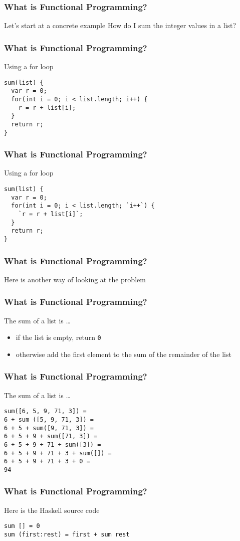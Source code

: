\begin{frame}
\frametitle{What is Functional Programming?}
\begin{block}{Let's start at a concrete example}
How do I sum the integer values in a list?
\end{block}
\end{frame}

\begin{frame}[fragile]
\frametitle{What is Functional Programming?}
\begin{block}{Using a for loop}
\begin{lstlisting}[style=java]
sum(list) {
  var r = 0;
  for(int i = 0; i < list.length; i++) {
    r = r + list[i];
  }
  return r;
}
\end{lstlisting}
\end{block}
\end{frame}

\begin{frame}[fragile]
\frametitle{What is Functional Programming?}
\begin{block}{Using a for loop}
\begin{lstlisting}[style=java]
sum(list) {
  var r = 0;
  for(int i = 0; i < list.length; `i++`) {
    `r = r + list[i]`;
  }
  return r;
}
\end{lstlisting}
\end{block}
\end{frame}

\begin{frame}
\frametitle{What is Functional Programming?}
\begin{center}
Here is another way of looking at the problem
\end{center}
\end{frame}

\begin{frame}
\frametitle{What is Functional Programming?}
\begin{block}{The sum of a list is \ldots}
\begin{itemize}
\item if the list is empty, return \lstinline{0}
\item otherwise add the first element to the sum of the remainder of the list
\end{itemize}
\end{block}
\end{frame}

\begin{frame}[fragile]
\frametitle{What is Functional Programming?}
\begin{block}{The sum of a list is \ldots}
\begin{lstlisting}
sum([6, 5, 9, 71, 3]) =
6 + sum ([5, 9, 71, 3]) =
6 + 5 + sum([9, 71, 3]) =
6 + 5 + 9 + sum([71, 3]) =
6 + 5 + 9 + 71 + sum([3]) =
6 + 5 + 9 + 71 + 3 + sum([]) =
6 + 5 + 9 + 71 + 3 + 0 =
94
\end{lstlisting}
\end{block}
\end{frame}

\begin{frame}[fragile]
\frametitle{What is Functional Programming?}
\begin{block}{Here is the Haskell source code}
\begin{lstlisting}[style=haskell]
sum [] = 0
sum (first:rest) = first + sum rest
\end{lstlisting}
\end{block}
\end{frame}
